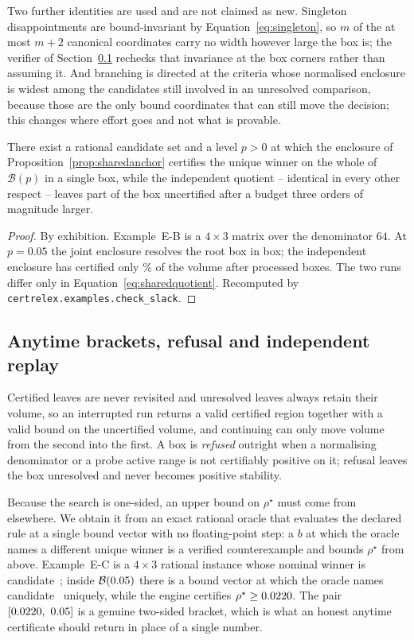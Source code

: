 Two further identities are used and are not claimed as new. Singleton
disappointments are bound-invariant by Equation~\eqref{eq:singleton}, so
$m$ of the at most $m+2$ canonical coordinates carry no width however large the
box is; the verifier of Section~\ref{sec:certrelex-replay} rechecks that
invariance at the box corners rather than assuming it. And branching is
directed at the criteria whose normalised enclosure is widest among the
candidates still involved in an unresolved comparison, because those are the
only bound coordinates that can still move the decision; this changes where
effort goes and not what is provable.

\begin{proposition}
\label{prop:slack}
There exist a rational candidate set and a level $p>0$ at which the enclosure
of Proposition~\ref{prop:sharedanchor} certifies the unique winner on the whole
of $\mathcal B(p)$ in a single box, while the independent quotient -- identical
in every other respect -- leaves part of the box uncertified after a budget
three orders of magnitude larger.
\end{proposition}
\begin{proof}
By exhibition. Example~E-B is a $4\times3$ matrix over the denominator $64$.
At $p=0.05$ the joint enclosure resolves the root box in
\crxExampleBJointBoxes{} box; the independent enclosure has certified only
\crxExampleBIndepVolume\% of the volume after \crxExampleBIndepBoxes{}
processed boxes. The two runs differ only in
Equation~\eqref{eq:sharedquotient}. Recomputed by
\texttt{certrelex.examples.check\_slack}.
\end{proof}

\subsection{Anytime brackets, refusal and independent replay}
\label{sec:certrelex-replay}
Certified leaves are never revisited and unresolved leaves always retain their
volume, so an interrupted run returns a valid certified region together with a
valid bound on the uncertified volume, and continuing can only move volume from
the second into the first. A box is \emph{refused} outright when a normalising
denominator or a probe active range is not certifiably positive on it; refusal
leaves the box unresolved and never becomes positive stability.

Because the search is one-sided, an upper bound on $\rho^\star$ must come from
elsewhere. We obtain it from an exact rational oracle that evaluates the
declared rule at a single bound vector with no floating-point step: a $b$ at
which the oracle names a different unique winner is a verified counterexample
and bounds $\rho^\star$ from above. Example~E-C is a $4\times3$ rational
instance whose nominal winner is candidate~\crxExampleCNominal{}; inside
$\mathcal B(0.05)$ there is a bound vector at which the oracle
names candidate~\crxExampleCWitness{} uniquely, while the engine certifies
$\rho^\star\ge0.0220$. The pair
$[\crxExampleCLower,\ \crxExampleCUpper]$ is a genuine two-sided bracket, which
is what an honest anytime certificate should return in place of a single
number.

